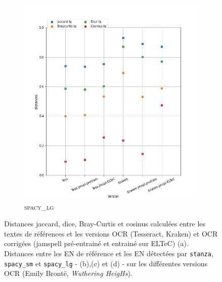 \begin{figure}
\begin{minipage}{6cm}
\begin{subfigure}{0.89\textwidth}
  \includegraphics[width=.89\textwidth]{IMAGES/ELTeC_DISTANCES_spaCy3.5.1/BRONTE-Wuthering-heights-graph-dist-spaCy3.5.1-lg.png}
   \caption{\textsc{spacy\_lg}}
  \label{fig: BRONTE-dist-spaCy3.5.1-lg}
  \end{subfigure}
  \end{minipage}
\caption{Distances jaccard, dice, Bray-Curtis et cosinus calculées entre les textes de références et les versions OCR (Tesseract, Kraken) et OCR corrigées (jamspell pré-entrainé et entrainé sur ELTeC) (a). Distances entre les EN de référence et les EN détectées par \texttt{stanza}, \texttt{spacy\_sm} et \texttt{spacy\_lg} - (b),(c) et (d) - sur les différentes versions OCR (Emily Brontë, \textit{Wuthering HeigHs}).}
\label{fig:}
\end{figure}


